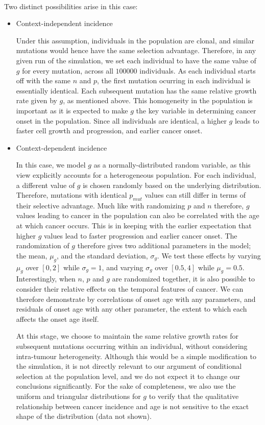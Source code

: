\documentclass[12pt, onecolumn]{article}
\begin{document}
	 \paragraph{\empty}Two distinct possibilities arise in this case:
	 \begin{itemize}
	 	\item Context-independent incidence
	 	
	 	Under this assumption, individuals in the population are clonal, and similar mutations would hence have the same selection advantage. Therefore, in any given run of the simulation, we set each individual to have the same value of $g$ for every mutation, across all $100000$ individuals. As each individual starts off with the same $n$ and $p$, the first mutation ocurring in each individual is essentially identical. Each subsequent mutation has the same relative growth rate given by $g$, as mentioned above. This homogeneity in the population is important as it is expected to make $g$ the key variable in determining cancer onset in the population. Since all individuals are identical, a higher $g$ leads to faster cell growth and progression, and earlier cancer onset.
	 	
	 	\item Context-dependent incidence
	 	
	 	In this case, we model $g$ as a normally-distributed random variable, as this view explicitly accounts for a heterogeneous population. For each individual, a different value of $g$ is chosen randomly based on the underlying distribution. Therefore, mutations with identical $p_{mut}$ values can still differ in terms of their selective advantage. Much like with randomizing $p$ and $n$ therefore, $g$ values leading to cancer in the population can also be correlated with the age at which cancer occurs. This is in keeping with the earlier expectation that higher $g$ values lead to faster progression and earlier cancer onset. The randomization of $g$ therefore gives two additional parameters in the model; the mean, $\mu_{g}$, and the standard deviation, $\sigma_{g}$. We test these effects by varying $\mu_{g}$ over $[0, 2]$ while $\sigma_{g}=1$, and varying $\sigma_{g}$ over $[0.5, 4]$ while $\mu_{g}=0.5$. Interestingly, when $n$, $p$ and $g$ are randomized together, it is also possible to consider their relative effects on the temporal features of cancer. We can therefore demonstrate by correlations of onset age with any parameters, and residuals of onset age with any other parameter, the extent to which each affects the onset age itself.
	 	
	 	At this stage, we choose to maintain the same relative growth rates for subsequent mutations occurring within an individual, without considering intra-tumour heterogeneity. Although this would be a simple modification to the simulation, it is not directly relevant to our argument of conditional selection at the population level, and we do not expect it to change our conclusions significantly. For the sake of completeness, we also use the uniform and triangular distributions for $g$ to verify that the qualitative relationship between cancer incidence and age is not sensitive to the exact shape of the distribution (data not shown).
	 \end{itemize}
	
\end{document}
